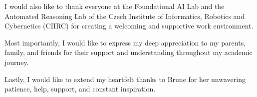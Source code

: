 \documentclass[11pt, twoside, openright]{thesis}
\begin{document}
I would also like to thank everyone at the Foundational AI Lab and the
Automated Reasoning Lab of the Czech Institute of Informatics, Robotics and
Cybernetics (CIIRC) for creating a welcoming and supportive work environment.

Most importantly, I would like to express my deep appreciation to my parents,
family, and friends for their support and understanding throughout my academic
journey.

Lastly, I would like to extend my heartfelt thanks to Brune for her unwavering
patience, help, support, and constant inspiration.

\cleardoublepage
\hypertarget{contents}{}
\tableofcontents

\mainmatter










\setlength{}
\printbibliography
\end{document}
